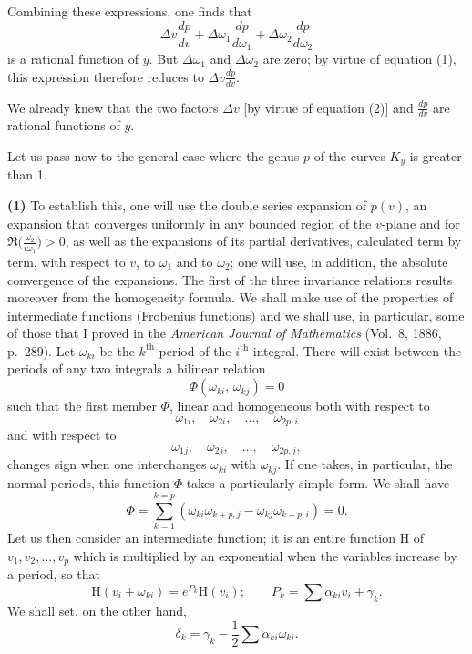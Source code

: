 \documentclass{article}
\begin{document}
Combining these expressions, one finds that
\[
\Delta v \frac{dp}{dv} + \Delta\omega_{1} \frac{dp}{d\omega_{1}} + \Delta\omega_{2} \frac{dp}{d\omega_{2}}
\]
is a rational function of $y$. But $\Delta\omega_{1}$ and $\Delta\omega_{2}$ are zero; by virtue of equation (1), this expression therefore reduces to $\Delta v \frac{dp}{dv}$.

We already knew that the two factors $\Delta v$ [by virtue of equation (2)] and $\frac{dp}{dv}$ are rational functions of $y$.

Let us pass now to the general case where the genus $p$ of the curves $K_{y}$ is greater than 1.

\textbf{(1)} To establish this, one will use the double series expansion of $p(v)$, an expansion that converges uniformly in any bounded region of the $v$-plane and for $\mathfrak{R}\bigl(\frac{\omega_{2}}{i\omega_{1}}\bigr) > 0$, as well as the expansions of its partial derivatives, calculated term by term, with respect to $v$, to $\omega_{1}$ and to $\omega_{2}$; one will use, in addition, the absolute convergence of the expansions. The first of the three invariance relations results moreover from the homogeneity formula.
We shall make use of the properties of intermediate functions (Frobenius functions) and we shall use, in particular, some of those that I proved in the \emph{American Journal of Mathematics} (Vol.~8, 1886, p.~289). Let $\omega_{ki}$ be the $k^{\text{th}}$ period of the $i^{\text{th}}$ integral. There will exist between the periods of any two integrals a bilinear relation
\[
\Phi(\omega_{ki},\, \omega_{kj}) = 0 \tag{4}
\]
such that the first member $\Phi$, linear and homogeneous both with respect to
\[
\omega_{1i}, \quad \omega_{2i}, \quad \ldots, \quad \omega_{2p, i}
\]
and with respect to
\[
\omega_{1j}, \quad \omega_{2j}, \quad \ldots, \quad \omega_{2p, j},
\]
changes sign when one interchanges $\omega_{ki}$ with $\omega_{kj}$. If one takes, in particular, the normal periods, this function $\Phi$ takes a particularly simple form. We shall have
\[
\Phi = \sum_{k=1}^{k=p} (\omega_{ki} \omega_{k+p, j} - \omega_{kj} \omega_{k+p, i}) = 0. \tag{4~bis}
\]
Let us then consider an intermediate function; it is an entire function $\mathrm{H}$ of $v_{1}, v_{2}, \ldots, v_{p}$ which is multiplied by an exponential when the variables increase by a period, so that
\[
\mathrm{H}(v_{i} + \omega_{ki}) = e^{P_{k}} \mathrm{H}(v_{i}); \qquad P_{k} = \sum \alpha_{ki} v_{i} + \gamma_{k}.
\]
We shall set, on the other hand,
\[
\delta_{k} = \gamma_{k} - \frac{1}{2} \sum \alpha_{ki} \omega_{ki}.
\]
\end{document}
